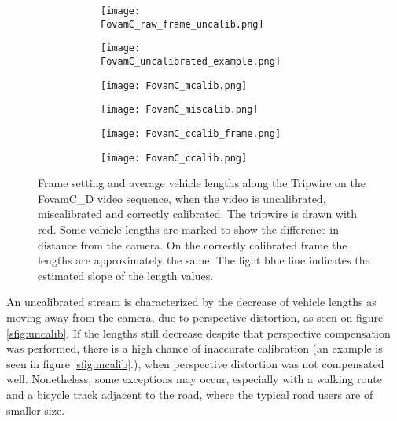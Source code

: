 \begin{figure}[!hp]
	\centering
	\begin{subfigure}[b]{\textwidth}
		\centering
		\begin{subfigure}[t]{0.45\textwidth}
		\texttt{[image: FovamC\_raw\_frame\_uncalib.png]}
		\end{subfigure}
	\quad
		\begin{subfigure}[t]{0.375\textwidth}
		\texttt{[image: FovamC\_uncalibrated\_example.png]}
		\end{subfigure}
	\end{subfigure}
	\hfill
	\begin{subfigure}[b]{\textwidth}
		\centering
		\begin{subfigure}[t]{0.45\textwidth}
			\texttt{[image: FovamC\_mcalib.png]}
		\end{subfigure}
		\quad
		\begin{subfigure}[t]{0.375\textwidth}
			\texttt{[image: FovamC\_miscalib.png]}
		\end{subfigure}
	\end{subfigure}
	\hfill
	\begin{subfigure}[b]{\textwidth}
		\centering
		\begin{subfigure}[t]{0.45\textwidth}
			\texttt{[image: FovamC\_ccalib\_frame.png]}
		\end{subfigure}
		\quad
		\begin{subfigure}[t]{0.375\textwidth}
			\texttt{[image: FovamC\_ccalib.png]}
		\end{subfigure}
	\end{subfigure}

	\caption{Frame setting and average vehicle lengths along the Tripwire on the FovamC\_D video sequence, when the video is uncalibrated, miscalibrated and correctly calibrated. The tripwire is drawn with red. Some vehicle lengths are marked to show the difference in distance from the camera. On the correctly calibrated frame the lengths are approximately the same. The light blue line indicates the estimated slope of the length values.\label{fig:calibration_versions}}
\end{figure}

An uncalibrated stream is characterized by the decrease of vehicle lengths as moving away from the camera, due to perspective distortion, as seen on figure \ref{sfig:uncalib}.
If the lengths still decrease despite that perspective compensation was performed, there is a high chance of inaccurate calibration (an example is seen in figure \ref{sfig:mcalib}.), when perspective distortion was not compensated well.
Nonetheless, some exceptions may occur, especially with a walking route and a bicycle track adjacent to the road, where the typical road users are of smaller size.

